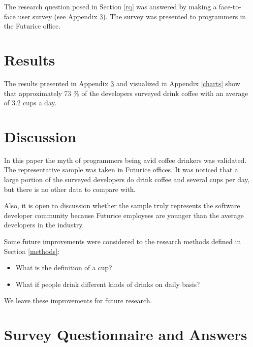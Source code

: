 \documentclass[a4paper,12pt]{article}
\begin{document}
The research question posed in Section \ref{rq} was answered by making
a face-to-face user survey (see Appendix \ref{survey}). The survey was
presented to programmers in the Futurice office.

\section{Results}

The results presented in Appendix \ref{survey} and visualized in
Appendix \ref{charts} show that approximately 73 \% of the developers
surveyed drink coffee with an average of 3.2 cups a day.

\section{Discussion}


In this paper the myth of programmers being avid coffee drinkers was
validated. The representative sample was taken in Futurice offices. It
was noticed that a large portion of the surveyed developers do drink
coffee and several cups per day, but there is no other data to compare
with.

Also, it is open to discussion whether the sample truly represents the
software developer community because Futurice employees are younger
than the average developers in the industry.

Some future improvements were considered to the research methods
defined in Section \ref{methods}:

\begin{itemize}
\item What is the definition of a cup?
\item What if people drink different kinds of drinks on daily basis?
\end{itemize}

We leave these improvements for future research.

\clearpage
\appendix
\section{Survey Questionnaire and Answers}
\label{survey}
\end{document}
